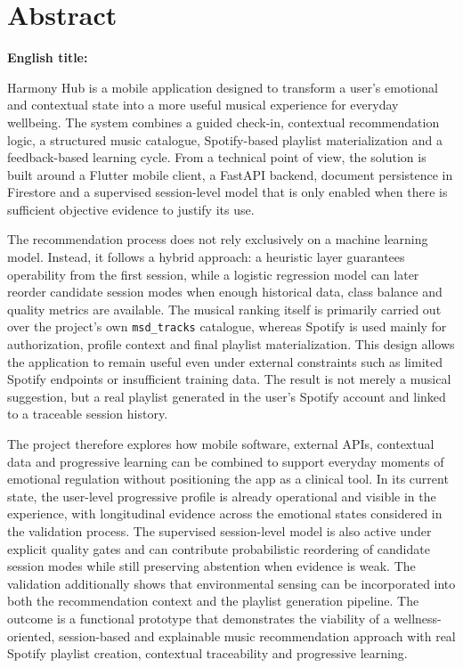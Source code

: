 \chapter*{Abstract}
{}

\noindent\textbf{English title:} \TituloTFGEn

\vspace{0.4cm}

Harmony Hub is a mobile application designed to transform a user's emotional and
contextual state into a more useful musical experience for everyday wellbeing.
The system combines a guided check-in, contextual recommendation logic, a
structured music catalogue, Spotify-based playlist materialization and a
feedback-based learning cycle. From a technical point of view, the solution is
built around a Flutter mobile client, a FastAPI backend, document persistence
in Firestore and a supervised session-level model that is only enabled when
there is sufficient objective evidence to justify its use.

The recommendation process does not rely exclusively on a machine learning
model. Instead, it follows a hybrid approach: a heuristic layer guarantees
operability from the first session, while a logistic regression model can later
reorder candidate session modes when enough historical data, class balance and
quality metrics are available. The musical ranking itself is primarily carried
out over the project's own \texttt{msd\_tracks} catalogue, whereas Spotify is
used mainly for authorization, profile context and final playlist
materialization. This design allows the application to remain useful even under
external constraints such as limited Spotify endpoints or insufficient training
data. The result is not merely a musical suggestion, but a real playlist
generated in the user's Spotify account and linked to a traceable session
history.

The project therefore explores how mobile software, external APIs, contextual
data and progressive learning can be combined to support everyday moments of
emotional regulation without positioning the app as a clinical tool. In its
current state, the user-level progressive profile is already operational and
visible in the experience, with longitudinal evidence across the
emotional states considered in the validation process. The supervised
session-level model is also active under explicit quality gates and can
contribute probabilistic reordering of candidate session modes while still
preserving abstention when evidence is weak. The validation additionally shows
that environmental sensing can be incorporated into both the recommendation
context and the playlist generation pipeline. The outcome is a functional
prototype that demonstrates the viability of a wellness-oriented,
session-based and explainable music recommendation approach with real Spotify
playlist creation, contextual traceability and progressive learning.
